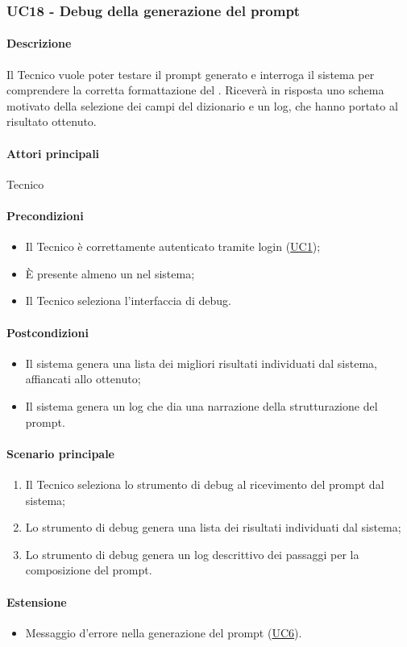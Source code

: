 \subsubsection{UC18 - Debug della generazione del prompt}\label{UC18}

\paragraph*{Descrizione}
Il Tecnico vuole poter testare il prompt generato e interroga il sistema per comprendere la corretta formattazione del . Riceverà in risposta uno schema motivato della selezione dei campi del dizionario e un log, che hanno portato al risultato ottenuto.

\paragraph*{Attori principali}
Tecnico

\paragraph*{Precondizioni}
\begin{itemize}
  \item Il Tecnico è correttamente autenticato tramite login (\hyperref[UC1]{UC1});
  \item È presente almeno un  nel sistema;
  \item Il Tecnico seleziona l’interfaccia di debug.
\end{itemize}

\paragraph*{Postcondizioni}
\begin{itemize}
  \item Il sistema genera una lista dei migliori risultati individuati dal sistema, affiancati allo  ottenuto;
  \item Il sistema genera un log che dia una narrazione della strutturazione del prompt. %
\end{itemize}

\paragraph*{Scenario principale}
\begin{enumerate}
  \item Il Tecnico seleziona lo strumento di debug al ricevimento del prompt dal sistema;
  \item Lo strumento di debug genera una lista dei risultati individuati dal sistema;
  \item Lo strumento di debug genera un log descrittivo dei passaggi per la composizione del prompt.  
\end{enumerate}

\paragraph*{Estensione}
\begin{itemize}
  \item Messaggio d'errore nella generazione del prompt (\hyperref[UC6]{UC6}).
\end{itemize}

